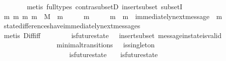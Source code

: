 \begin{isabellebody}
\ \ \ \ \ \ \isamarkupfalse%
\ {\isacharparenleft}metis\ {\isacharparenleft}full{\isacharunderscore}types{\isacharparenright}\ contra{\isacharunderscore}subsetD\ insert{\isacharunderscore}subset\ subsetI{\isacharparenright}\isanewline
\ \ \ \ \isamarkupfalse%
\ \isamarkupfalse%
\ {\isachardoublequoteopen}{\isasymexists}m{}\ m{}{\isachardot}\ {\isacharbraceleft}m{}{\isacharcomma}\ m{}{\isacharbraceright}\ {\isasymsubseteq}\ M\ {\isasymand}\ m{}\ {\isasymin}\ {\isasymsigma}{\isacharprime}\ {\isacharminus}\ {\isasymsigma}\ {\isasymand}\ m{}\ {\isasymin}\ {\isasymsigma}{\isacharprime}\ {\isacharminus}\ {\isasymsigma}\ {\isasymand}\ m{}\ {\isasymnoteq}\ m{}\ {\isasymand}\ immediately{\isacharunderscore}next{\isacharunderscore}message\ {\isacharparenleft}{\isasymsigma}{\isacharcomma}\ m{}{\isacharparenright}{\isachardoublequoteclose}\isanewline
\ \ \ \ \ \ \isamarkupfalse%
\ state{\isacharunderscore}differences{\isacharunderscore}have{\isacharunderscore}immediately{\isacharunderscore}next{\isacharunderscore}messages\isanewline
\ \ \ \ \ \ \isamarkupfalse%
\ {\isacharparenleft}metis\ Diff{\isacharunderscore}iff\ {\isacartoucheopen}{\isasymsigma}{\isacharprime}\ {\isasymin}\ {\isasymSigma}\ {\isasymand}\ {\isasymsigma}\ {\isasymin}\ {\isasymSigma}\ {\isasymand}\ is{\isacharunderscore}future{\isacharunderscore}state\ {\isacharparenleft}{\isasymsigma}{\isacharcomma}\ {\isasymsigma}{\isacharprime}{\isacharparenright}{\isacartoucheclose}\ insert{\isacharunderscore}subset\ message{\isacharunderscore}in{\isacharunderscore}state{\isacharunderscore}is{\isacharunderscore}valid{\isacharparenright}\isanewline
\ \ \isamarkupfalse%
\ \ \ \ \ \ \isanewline
\ \ \isamarkupfalse%
\ {\isachardoublequoteopen}{\isasymforall}\ {\isasymsigma}\ {\isasymsigma}{\isacharprime}{\isachardot}\ {\isacharparenleft}{\isasymsigma}{\isacharcomma}\ {\isasymsigma}{\isacharprime}{\isacharparenright}\ {\isasymin}\ minimal{\isacharunderscore}transitions\ {\isasymand}\ {\isasymnot}\ is{\isacharunderscore}singleton\ {\isacharparenleft}{\isasymsigma}{\isacharprime}{\isacharminus}\ {\isasymsigma}{\isacharparenright}\ {\isasymlongrightarrow}\isanewline
\ \ \ \ \ \ \ \ \ \ \ \ \ \ {\isacharparenleft}{\isasymexists}\ {\isasymsigma}{\isacharprime}{\isacharprime}{\isachardot}\ {\isasymsigma}{\isacharprime}{\isacharprime}\ {\isasymin}\ {\isasymSigma}\ {\isasymand}\ is{\isacharunderscore}future{\isacharunderscore}state\ {\isacharparenleft}{\isasymsigma}{\isacharcomma}\ {\isasymsigma}{\isacharprime}{\isacharprime}{\isacharparenright}\ {\isasymand}\ is{\isacharunderscore}future{\isacharunderscore}state\ {\isacharparenleft}{\isasymsigma}{\isacharprime}{\isacharprime}{\isacharcomma}\ {\isasymsigma}{\isacharprime}{\isacharparenright}\ {\isasymand}\ {\isasymsigma}\ {\isasymnoteq}\ {\isasymsigma}{\isacharprime}{\isacharprime}\ {\isasymand}\ {\isasymsigma}{\isacharprime}{\isacharprime}\ {\isasymnoteq}\ {\isasymsigma}{\isacharprime}{\isacharparenright}{\isachardoublequoteclose}\isanewline

\end{isabellebody}
